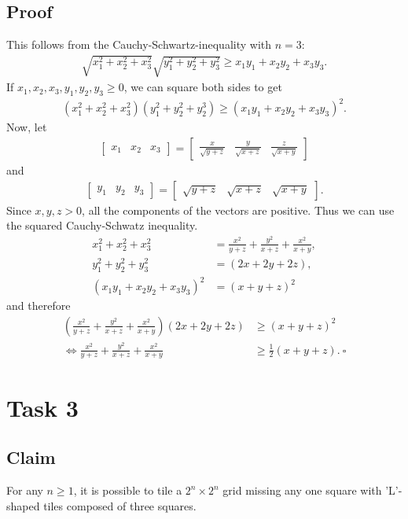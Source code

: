 \documentclass{article}
\begin{document}
\subsection*{Proof}
This follows from the Cauchy-Schwartz-inequality with $n=3$:
\begin{align*}
  \sqrt{x^2_1+x^2_2+x^2_3}\sqrt{y^2_1+y^2_2+ y^2_3}\geq x_1y_1+x_2y_2+ x_3y_3.
\end{align*}
If $x_1,x_2,x_3,y_1,y_2,y_3\geq 0$, we can square both sides to get
\begin{align*}
  (x^2_1+x^2_2+x^2_3)(y^2_1+y^2_2+y^3_2) \geq (x_1y_1+x_2y_2+x_3y_3)^2.
\end{align*}
Now, let
\begin{align*}
  \begin{bmatrix}
    x_1&x_2&x_3
  \end{bmatrix}
  =
  \begin{bmatrix}
    \frac{x}{\sqrt{y+z}}
    &\frac{y}{\sqrt{x+z}}
    &\frac{z}{\sqrt{x+y}}
  \end{bmatrix}
\end{align*}
and
\begin{align*}
  \begin{bmatrix}
    y_1&y_2&y_3
  \end{bmatrix}
  =
  \begin{bmatrix}
    \sqrt{y+z}
    &\sqrt{x+z}
    &\sqrt{x+y}
  \end{bmatrix}.
\end{align*}
Since $x,y,z>0$, all the components of the vectors are positive. Thus we can use the squared Cauchy-Schwatz inequality.
\begin{align*}
  x^2_1+x^2_2+x^2_3&=\frac{x^2}{y+z}+\frac{y^2}{x+z}+\frac{x^2}{x+y},\\
  y^2_1+y^2_2+y^2_3&=(2x+2y+2z),\\
  (x_1y_1+x_2y_2+x_3y_3)^2 &= (x+y+z)^2
\end{align*}
and therefore
\begin{align*}
  \left(\frac{x^2}{y+z}+\frac{y^2}{x+z}+\frac{x^2}{x+y}\right)\left(2x+2y+2z\right)&\geq (x+y+z)^2\\
  \Leftrightarrow \frac{x^2}{y+z}+\frac{y^2}{x+z}+\frac{x^2}{x+y}&\geq \frac{1}{2}(x+y+z).\:\square
\end{align*}
\section*{Task 3}
\subsection*{Claim}
For any $n\geq 1$, it is possible to tile a $2^n\times 2^n$  grid missing any one square with 'L'-shaped tiles composed of three squares.
\end{document}
